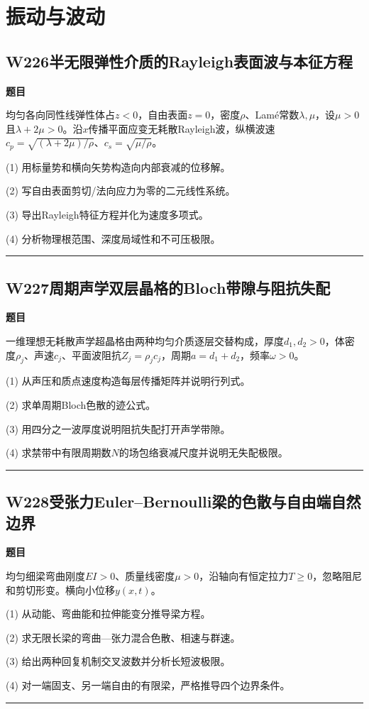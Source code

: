 \documentclass[UTF8,a4paper,11pt,oneside,openany]{ctexbook}
\begin{document}
\chapter{振动与波动}
\section*{W226\quad 半无限弹性介质的Rayleigh表面波与本征方程}
\textbf{题目}\par
均匀各向同性线弹性体占$z<0$，自由表面$z=0$，密度$\rho$、Lamé常数$\lambda,\mu$，设$\mu>0$且$\lambda+2\mu>0$。沿$x$传播平面应变无耗散Rayleigh波，纵横波速$c_p=\sqrt{(\lambda+2\mu)/\rho}$、$c_s=\sqrt{\mu/\rho}$。
\par\smallskip\noindent (1) 用标量势和横向矢势构造向内部衰减的位移解。
\par\smallskip\noindent (2) 写自由表面剪切/法向应力为零的二元线性系统。
\par\smallskip\noindent (3) 导出Rayleigh特征方程并化为速度多项式。
\par\smallskip\noindent (4) 分析物理根范围、深度局域性和不可压极限。
\par\medskip\hrule\medskip
\section*{W227\quad 周期声学双层晶格的Bloch带隙与阻抗失配}
\textbf{题目}\par
一维理想无耗散声学超晶格由两种均匀介质逐层交替构成，厚度$d_1,d_2>0$，体密度$\rho_j$、声速$c_j$、平面波阻抗$Z_j=\rho_jc_j$，周期$a=d_1+d_2$，频率$\omega>0$。
\par\smallskip\noindent (1) 从声压和质点速度构造每层传播矩阵并说明行列式。
\par\smallskip\noindent (2) 求单周期Bloch色散的迹公式。
\par\smallskip\noindent (3) 用四分之一波厚度说明阻抗失配打开声学带隙。
\par\smallskip\noindent (4) 求禁带中有限周期数$N$的场包络衰减尺度并说明无失配极限。
\par\medskip\hrule\medskip
\section*{W228\quad 受张力Euler–Bernoulli梁的色散与自由端自然边界}
\textbf{题目}\par
均匀细梁弯曲刚度$EI>0$、质量线密度$\mu>0$，沿轴向有恒定拉力$T\ge0$，忽略阻尼和剪切形变。横向小位移$y(x,t)$。
\par\smallskip\noindent (1) 从动能、弯曲能和拉伸能变分推导梁方程。
\par\smallskip\noindent (2) 求无限长梁的弯曲—张力混合色散、相速与群速。
\par\smallskip\noindent (3) 给出两种回复机制交叉波数并分析长短波极限。
\par\smallskip\noindent (4) 对一端固支、另一端自由的有限梁，严格推导四个边界条件。
\par\medskip\hrule\medskip
\end{document}

